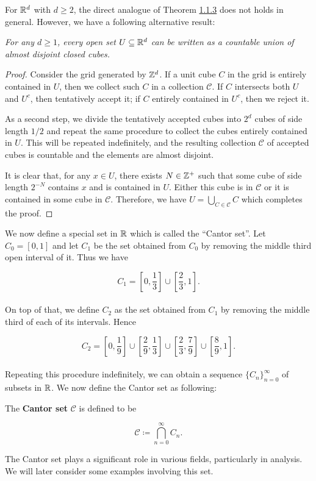 \documentclass[12pt, a4paper, openany, twoside]{book}
\theoremstyle{definition}
\theoremstyle{remark}
\theoremstyle{plain}
\numberwithin{equation}{section}
\begin{document}
For ${\mathbb {R}}^d$ with $d\geq 2$, the direct analogue of Theorem \hyperref[Theorem 1.1.3]{1.1.3} does not holds in general. However, we have a following alternative result:
\vspace{5mm}
\begin{tcolorbox}[colback=yellow!10!white,colframe=red!75!black,title=Theorem 1.1.4]\label{Theorem 1.1.4}
    \emph{For any $d\geq 1$, every open set $U\subseteq{\mathbb {R}}^d$ can be written as a countable union of almost disjoint closed cubes.}
\end{tcolorbox}
\begin{proof}
    Consider the grid generated by ${\mathbb {Z}}^d$. If a unit cube $C$ in the grid is entirely contained in $U$, then we collect such $C$ in a collection $\mathcal{C}$. If $C$ intersects both $U$ and $U^c$, then tentatively accept it; if $C$ entirely contained in $U^c$, then we reject it.

    As a second step, we divide the tentatively accepted cubes into $2^d$ cubes of side length $1/2$ and repeat the same procedure to collect the cubes entirely contained in $U$. This will be repeated indefinitely, and the resulting collection $\mathcal{C}$ of accepted cubes is countable and the elements are almost disjoint. 
    
    It is clear that, for any $x\in U$, there exists $N\in{\mathbb {Z}}^+$ such that some cube of side length $2^{-N}$ contains $x$ and is contained in $U$. Either this cube is in $\mathcal{C}$ or it is contained in some cube in $\mathcal{C}$. Therefore, we have $U=\bigcup_{C\in\mathcal{C}}{C}$ which completes the proof.
\end{proof}
\vspace{5mm}

We now define a special set in ${\mathbb {R}}$ which is called the ``Cantor set''. Let $C_0=[0,1]$ and let $C_1$ be the set obtained from $C_0$ by removing the middle third open interval of it. Thus we have

\[C_1=\left[0,\frac{1}{3}\right]\cup\left[\frac{2}{3},1\right].\]
\\
On top of that, we define $C_2$ as the set obtained from $C_1$ by removing the middle third of each of its intervals. Hence 

\[C_2=\left[0,\frac{1}{9}\right]\cup\left[\frac{2}{9},\frac{1}{3}\right]\cup\left[\frac{2}{3},\frac{7}{9}\right]\cup\left[\frac{8}{9},1\right].\]
\\
Repeating this procedure indefinitely, we can obtain a sequence $\{C_n\}_{n=0}^{\infty}$ of subsets in ${\mathbb {R}}$. We now define the Cantor set as following:
\vspace{5mm}
\begin{tcolorbox}[colback=yellow!10!white,colframe=blue!75!black,title=Definition 1.1.2]\label{Definition 1.1.2}
    The \textbf{Cantor set} $\mathcal{C}$ is defined to be 

    \[\mathcal{C}\coloneqq\bigcap_{n=0}^{\infty}{C_n}.\]
\end{tcolorbox}
\vspace{5mm}
The Cantor set plays a significant role in various fields, particularly in analysis. We will later consider some examples involving this set.
\end{document}
